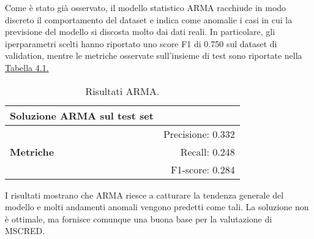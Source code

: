 
Come è stato già osservato, il modello statistico ARMA racchiude in modo discreto il comportamento del dataset e indica come anomalie i casi in 
cui la previsione del modello si discosta molto dai dati reali. In particolare, gli iperparametri scelti 
hanno riportato uno score F1 di 0.750 sul dataset di validation, mentre 
le metriche osservate sull'insieme di test sono riportate nella \hyperref[tab:arma-metrics]{Tabella 4.1.}

\begin{table}[H]
    \centering
    \caption{Risultati ARMA.}
    \begin{tabular}{lr}
    \toprule
    \textbf{Soluzione ARMA sul test set}  \\
    \midrule
    \multirow{3}{*}{\textbf{Metriche}} & Precisione: 0.332 \\
    & Recall: 0.248 \\
    & F1-score: 0.284 \\
    \bottomrule
    \end{tabular}
    \label{tab:arma-metrics}
\end{table}

I risultati mostrano che ARMA riesce a catturare la tendenza generale del modello e molti 
andamenti anomali vengono predetti come tali. La soluzione non è ottimale, ma fornisce 
comunque una buona base per la valutazione di MSCRED.